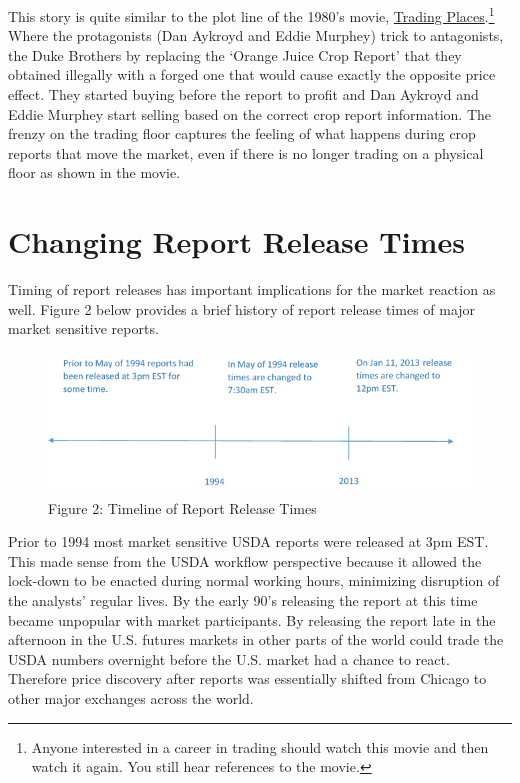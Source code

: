 \documentclass[
  letterpaper,
  DIV=11,
  numbers=noendperiod]{scrreprt}
\begin{document}
This story is quite similar to the plot line of the 1980's movie,
\href{http://www.imdb.com/title/tt0086465/}{Trading Places}.\footnote{Anyone
  interested in a career in trading should watch this movie and then
  watch it again. You still hear references to the movie.} Where the
protagonists (Dan Aykroyd and Eddie Murphey) trick to antagonists, the
Duke Brothers by replacing the `Orange Juice Crop Report' that they
obtained illegally with a forged one that would cause exactly the
opposite price effect. They started buying before the report to profit
and Dan Aykroyd and Eddie Murphey start selling based on the correct
crop report information. The frenzy on the trading floor captures the
feeling of what happens during crop reports that move the market, even
if there is no longer trading on a physical floor as shown in the movie.

\hypertarget{changing-report-release-times-1}{%
\section{Changing Report Release
Times}\label{changing-report-release-times-1}}

Timing of report releases has important implications for the market
reaction as well. Figure 2 below provides a brief history of report
release times of major market sensitive reports.

\begin{figure}

{\centering \includegraphics{images/NASS_release_timeline.png}

}

\caption{Figure 2: Timeline of Report Release Times}

\end{figure}

Prior to 1994 most market sensitive USDA reports were released at 3pm
EST. This made sense from the USDA workflow perspective because it
allowed the lock-down to be enacted during normal working hours,
minimizing disruption of the analysts' regular lives. By the early 90's
releasing the report at this time became unpopular with market
participants. By releasing the report late in the afternoon in the U.S.
futures markets in other parts of the world could trade the USDA numbers
overnight before the U.S. market had a chance to react. Therefore price
discovery after reports was essentially shifted from Chicago to other
major exchanges across the world.
\end{document}
